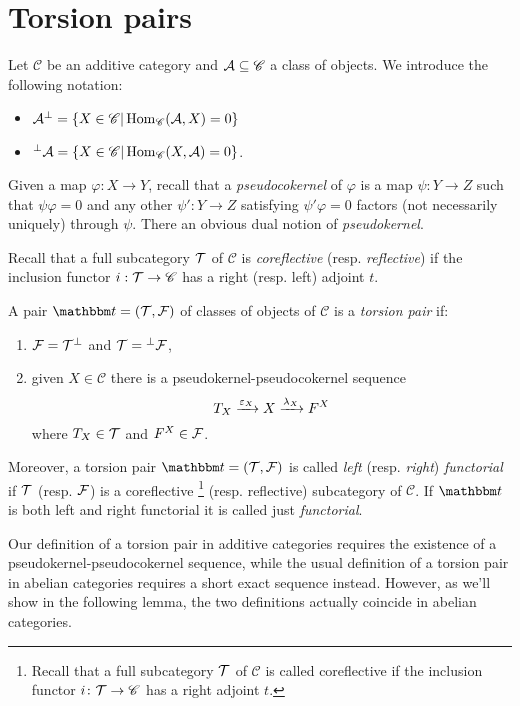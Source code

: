 \section{Torsion pairs}

Let $\mathscr{C}$ be an additive category and $\mathcal{A}\subseteq \mathscr{C}$ a class of objects. We introduce the following notation:
\begin{itemize}
  \item $\mathcal{A}^\perp = \{X\in\mathscr{C}| \operatorname{Hom}_{\mathscr{C}}(\mathcal{A},X)=0\}$
  \item ${^\perp \mathcal{A}}=\{ X\in \mathscr{C}| \operatorname{Hom}_{\mathscr{C}}(X,\mathcal{A})=0\}$.
\end{itemize}

Given a map $\varphi:X\to Y$, recall that a \emph{pseudocokernel} of $\varphi$ is a map $\psi:Y\to Z$ such that $\psi\varphi=0$ and any other $\psi':Y\to Z$ satisfying $\psi'\varphi=0$ factors (not necessarily uniquely) through $\psi$. There an obvious dual notion of \emph{pseudokernel}.

Recall that a full subcategory $\mathcal{T}$ of $\mathscr{C}$ is \emph{coreflective} (resp. \emph{reflective}) if the inclusion functor $i:\mathcal{T}\to\mathscr{C}$ has a right (resp. left) adjoint $t$.
\begin{definition}\label{5:def:torsion_pair}
  A pair $\t=(\T,\F)$ of classes of objects of $\mathscr{C}$ is a \emph{torsion pair} if:
  \begin{enumerate}
    \item $\mathcal{F}=\mathcal{T}^\perp$ and $\mathcal{T} = {^\perp \mathcal{F}}$,
    \item given $X\in \mathscr{C}$ there is a pseudokernel-pseudocokernel sequence
      \begin{equation*}
        T_X\xrightarrow{\varepsilon_X} X\xrightarrow{\lambda_X} F^X
      \end{equation*}
      where $T_X\in\mathcal{T}$ and $F^X\in\mathcal{F}$.
  \end{enumerate}
  Moreover, a torsion pair $\t=(\T,\F)$ is called \emph{left} (resp. \emph{right}) \emph{functorial} if $\mathcal{T}$ (resp. $\mathcal{F}$) is a coreflective
  \footnote{Recall that a full subcategory $\mathcal{T}$ of $\mathscr{C}$ is called coreflective if the inclusion functor $i\colon\mathcal{T}\to \mathscr{C}$ has a right adjoint $t$.}
  (resp. reflective) subcategory of $\mathscr{C}$. If $\t$ is both left and right functorial it is called just \emph{functorial}.
\end{definition}

\begin{rmk}
  Our definition of a torsion pair in additive categories requires the existence of a pseudokernel-pseudocokernel sequence, while the usual definition of a torsion pair in abelian categories requires a short exact sequence instead. However, as we'll show in the following lemma, the two definitions actually coincide in abelian categories.
\end{rmk}

